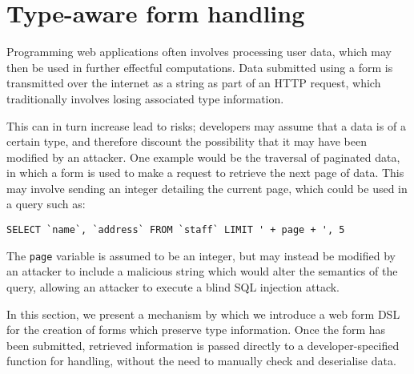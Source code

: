 \documentclass[preprint]{sigplanconf}
\begin{document}

\section{Type-aware form handling}
\label{form}
Programming web applications often involves processing user data, which may then be used in further effectful computations. Data submitted using a form is transmitted over the internet as a string as part of an HTTP request, which traditionally involves losing associated type information.

This can in turn increase lead to risks; developers may assume that a data is of a certain type, and therefore discount the possibility that it may have been modified by an attacker. One example would be the traversal of paginated data, in which a form is used to make a request to retrieve the next page of data. This may involve sending an integer detailing the current page, which could be used in a query such as:

{\small
\begin{verbatim}
SELECT `name`, `address` FROM `staff` LIMIT ' + page + ', 5
\end{verbatim}
}
The \texttt{page} variable is assumed to be an integer, but may instead be modified by an attacker to include a malicious string which would alter the semantics of the query, allowing an attacker to execute a blind SQL injection attack. %

In this section, we present a mechanism by which we introduce a web form DSL for the creation of forms which preserve type information. Once the form has been submitted, retrieved information is passed directly to a developer-specified function for handling, without the need to manually check and deserialise data. 
\end{document}
